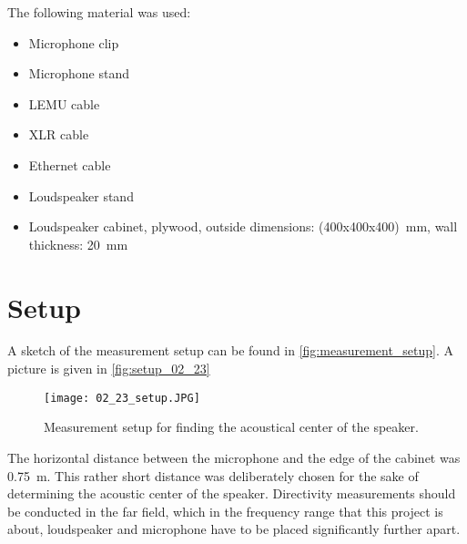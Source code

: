 The following material was used:
\begin{itemize}[noitemsep]
\item Microphone clip
\item Microphone stand
\item LEMU cable
\item XLR cable
\item Ethernet cable
\item Loudspeaker stand
\item Loudspeaker cabinet, plywood, outside dimensions: (400x400x400)\SI{}{\milli\meter}, wall thickness: \SI{20}{\milli\meter}
\end{itemize}

\section*{Setup}
A sketch of the measurement setup can be found in \autoref{fig:measurement_setup}. A picture is given in \autoref{fig:setup_02_23}

\begin{figure}[htbp]
	\centering
	\texttt{[image: 02\_23\_setup.JPG]}
	\caption{Measurement setup for finding the acoustical center of the speaker.}
		\label{fig:setup_02_23}
\end{figure}

The horizontal distance between the microphone and the edge of the cabinet was \SI{0.75}{\meter}. This rather short distance was deliberately chosen for the sake of determining the acoustic center of the speaker. Directivity measurements should be conducted in the far field, which in the frequency range that this project is about, loudspeaker and microphone have to be placed significantly further apart. 

